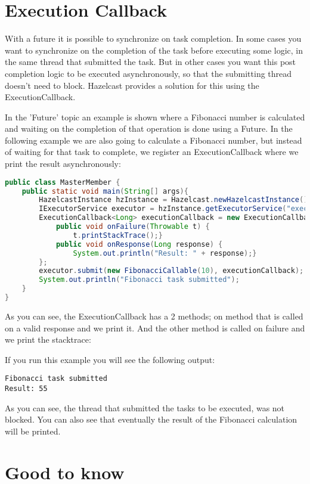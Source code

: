 \section{Execution Callback}
With a future it is possible to synchronize on task completion. In some cases you want to synchronize on the completion of the task before executing some logic, in the same thread that submitted the task. But in other cases you want this post completion logic to be executed asynchronously, so that the submitting thread doesn't need to block. Hazelcast provides a solution for this using the ExecutionCallback.

In the 'Future' topic an example is shown where a Fibonacci number is calculated and waiting on the completion of that operation is done using a Future. In the following example we are also going to calculate a Fibonacci number, but instead of waiting for that task to complete, we register an ExecutionCallback where we print the result asynchronously:
\begin{lstlisting}[language=java]
public class MasterMember {
    public static void main(String[] args){
        HazelcastInstance hzInstance = Hazelcast.newHazelcastInstance();
        IExecutorService executor = hzInstance.getExecutorService("executor");
        ExecutionCallback<Long> executionCallback = new ExecutionCallback<Long>() {
            public void onFailure(Throwable t) {
                t.printStackTrace();}
            public void onResponse(Long response) {
                System.out.println("Result: " + response);}
        };
        executor.submit(new FibonacciCallable(10), executionCallback);
        System.out.println("Fibonacci task submitted");
    }
}
\end{lstlisting}
As you can see, the ExecutionCallback has a 2 methods; on method that is called on a valid response and we print it. And the other method is called on failure and we print the stacktrace: 

If you run this example you will see the following output:
\begin{lstlisting}
Fibonacci task submitted
Result: 55
\end{lstlisting}
As you can see, the thread that submitted the tasks to be executed, was not blocked. You can also see that eventually the result of the Fibonacci calculation will be printed. 

\section{Good to know}

